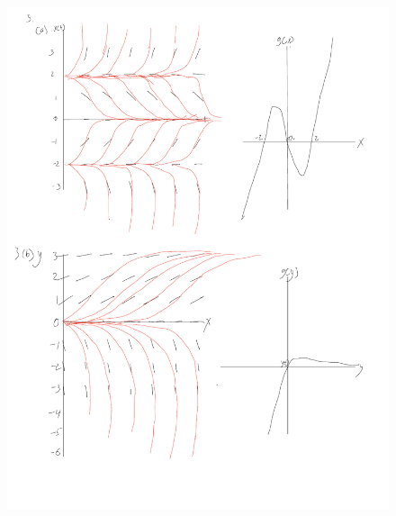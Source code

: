 \documentclass[addpoints, 11pt]{exam}
\begin{document}
\begin{questions}
\begin{parts}
\begin{figure}[H]
	\end{figure}
	\begin{figure}[H]
		\includegraphics[page=4,scale=0.4]{Note Oct 29, 2023.pdf}

\end{figure}
\end{parts}
\end{questions}
\end{document}
